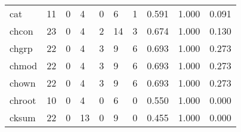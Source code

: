 \begin{longtable}{lp{2.0cm}p{2.0cm}p{2.0cm}p{2.0cm}p{2.0cm}p{2.0cm}p{2.0cm}p{2.0cm}p{2.0cm}}
cat       &                     11 &                                             0 &                                            4 &                                           0 &                                            6 &                                          1 &                                0.591 &                                  1.000 &                                0.091 \\
chcon     &                     23 &                                             0 &                                            4 &                                           2 &                                           14 &                                          3 &                                0.674 &                                  1.000 &                                0.130 \\
chgrp     &                     22 &                                             0 &                                            4 &                                           3 &                                            9 &                                          6 &                                0.693 &                                  1.000 &                                0.273 \\
chmod     &                     22 &                                             0 &                                            4 &                                           3 &                                            9 &                                          6 &                                0.693 &                                  1.000 &                                0.273 \\
chown     &                     22 &                                             0 &                                            4 &                                           3 &                                            9 &                                          6 &                                0.693 &                                  1.000 &                                0.273 \\
chroot    &                     10 &                                             0 &                                            4 &                                           0 &                                            6 &                                          0 &                                0.550 &                                  1.000 &                                0.000 \\
cksum     &                     22 &                                             0 &                                           13 &                                           0 &                                            9 &                                          0 &                                0.455 &                                  1.000 &                                0.000 \\

\end{longtable}
